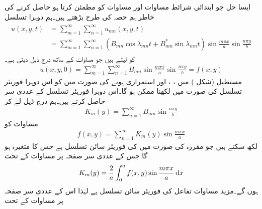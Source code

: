 \quad ایسا حل جو ابتدائی شرائط مساوات  اور مساوات  کو مطمئن کرتا ہو حاصل کرنے کی خاطر ہم  حصہ  کی طرح بڑھتے ہیں۔ہم دوہرا تسلسل
\begin{gather}
\begin{aligned}\label{مساوات_جزوی_مکمل_حل_مستطیل_جھلی}
u(x,y,t)&=\sum_{m=1}^{\infty}\sum_{n=1}^{\infty} u_{mn}(x,y,t)\\
&=\sum_{m=1}^{\infty}\sum_{n=1}^{\infty}(B_{mn}\cos \lambda_{mn}t+B^*_{mn}\sin \lambda_{mn}t)\sin\frac{m\pi x}{a}\sin \frac{n\pi y}{b}
\end{aligned}
\end{gather}
کو لیتے ہیں جو مساوات  کے ساتھ درج ذیل   دیتی ہے۔
\begin{align}\label{مساوات_جزوی_دوہرا_فوریئر_تسلسل_الف}
u(x,y,0)=\sum_{m=1}^{\infty}\sum_{n=1}^{\infty}B_{mn}\sin\frac{m\pi x}{a}\sin \frac{n\pi y}{b}=f(x,y)
\end{align}
مستطیل  (شکل ) میں ، ،  اور  استمراری ہونے کی صورت میں  کو اس دوہرا فوریئر تسلسل کی صورت میں لکھنا ممکن ہو گا۔اس دوہرا فوریئر تسلسل کے عددی سر حاصل کرتے ہیں۔ہم درج ذیل لے کر
\begin{align}\label{مساوات_جزوی_دوہرا_فوریئر_تسلسل_ب}
K_m(y)=\sum_{n=1}^{\infty}B_{mn}\sin \frac{n\pi y}{b}
\end{align}
مساوات  کو
\begin{align}\label{مساوات_جزوی_دوہرا_فوریئر_تسلسل_پ}
f(x,y)=\sum_{n=1}^{\infty}K_m(y)\sin \frac{m\pi x}{a}
\end{align}
لکھ سکتے ہیں جو مقررہ  کی صورت میں  کی  فوریئر سائن تسلسل ہے جس کا متغیرہ  ہو گا جس کے عددی سر صفحہ  پر مساوات  کے تحت
\begin{align}\label{مساوات_جزوی_دوہرا_فوریئر_تسلسل_ت}
K_m(y)=\frac{2}{a}\int_0^a f(x,y)\sin\frac{m\pi x}{a}\dif x
\end{align}
ہوں گے۔مزید مساوات  تفاعل  کی فوریئر سائن تسلسل ہے لہٰذا اس کے عددی سر صفحہ  پر مساوات  کے تحت

